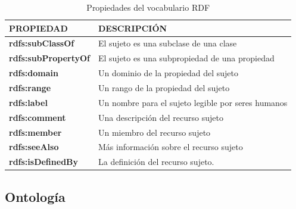\begin{table}[H]
	\caption{Propiedades del vocabulario RDF}
	\label{tabla-rdfs2}
	\centering
	\begin{tabular}{|
			>{\columncolor[HTML]{FFFFFF}}l |m{8cm}|}
		\hline
		\cellcolor[HTML]{EFEFEF}\textbf{PROPIEDAD} & \cellcolor[HTML]{EFEFEF} \textbf{DESCRIPCIÓN}\\ \hline
		\textbf{rdfs:subClassOf}                         &         El sujeto es una subclase de una clase                 \\ \hline
		\textbf{rdfs:subPropertyOf}                         &     El sujeto es una subpropiedad de una propiedad                     \\ \hline
		\textbf{rdfs:domain}                         &           Un dominio de la propiedad del sujeto               \\ \hline
		\textbf{rdfs:range}                         &        Un rango de la propiedad del sujeto                  \\ \hline
		\textbf{rdfs:label}                         &        Un nombre para el sujeto legible por seres humanos                   \\ \hline
		\textbf{rdfs:comment}                         &        Una descripción del recurso sujeto                  \\ \hline
		\textbf{rdfs:member}                         &        Un miembro del recurso sujeto                  \\ \hline
		\textbf{rdfs:seeAlso}                         &              Más información sobre el recurso sujeto            \\ \hline
		\textbf{rdfs:isDefinedBy}                         &       La definición del recurso sujeto. 
		\\ \hline
	\end{tabular}
\end{table}



\subsection{Ontología} %

